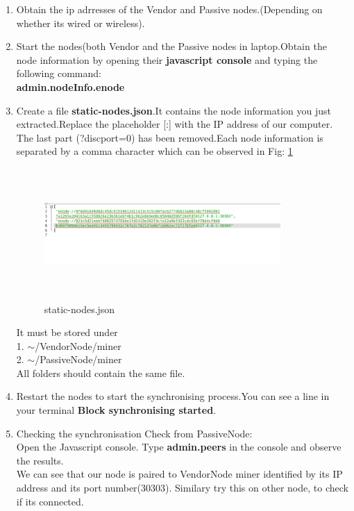 \documentclass[journal,12pt,twocolumn]{IEEEtran}
\begin{document}
\begin{enumerate}
\item Obtain the ip adrresses of the Vendor and Passive nodes.(Depending on whether its wired or wireless).

\item Start the nodes(both Vendor and the Passive nodes in laptop.Obtain the node information by opening their \textbf{javascript console} and typing the following command:\\ 

\textbf{admin.nodeInfo.enode}\\

\item Create a file \textbf{static-nodes.json}.It contains the node information you just extracted.Replace the placeholder [:] with the IP address of our computer. The last part (?discport=0) has been removed.Each node information is separated by a comma character which can be observed in Fig: \ref{fig:3}\\

 \begin{figure}
  \includegraphics[width=9cm, height=5cm]{static.png}
  \caption{static-nodes.json}
  \label{fig:3}
\end{figure} 


It must be stored under\\
1. $\sim$/VendorNode/miner\\
2. $\sim$/PassiveNode/miner\\


All folders should contain the same file.\\

 

\item Restart the nodes to start the synchronising process.You can see a line in your terminal \textbf{Block synchronising started}.

\item Checking the synchronisation
 Check from PassiveNode:\\
 Open the Javascript console. Type \textbf{admin.peers} in the console and observe the results.\\
 We can see that our node is paired to VendorNode miner  identified by its IP address and its port number(30303). Similary try this on other node, to check if its connected.\\
 

\end{enumerate}
\end{document}
